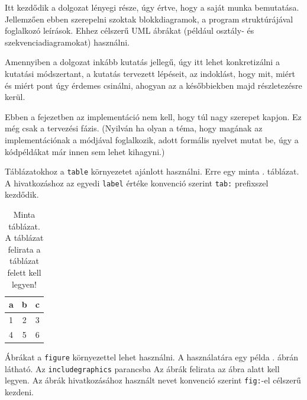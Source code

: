 \iffalse
Itt kezdődik a dolgozat lényegi része, úgy értve, hogy a saját munka bemutatása.
Jellemzően ebben szerepelni szoktak blokkdiagramok, a program struktúrájával foglalkozó leírások.
Ehhez célszerű UML ábrákat (például osztály- és szekvenciadiagramokat) használni.

Amennyiben a dolgozat inkább kutatás jellegű, úgy itt lehet konkretizálni a kutatási módszertant, a kutatás tervezett lépéseit, az indoklást, hogy mit, miért és miért pont úgy érdemes csinálni, ahogyan az a későbbiekben majd részletezésre kerül.

Ebben a fejezetben az implementáció nem kell, hogy túl nagy szerepet kapjon.
Ez még csak a tervezési fázis.
(Nyilván ha olyan a téma, hogy magának az implementációnak a módjával foglalkozik, adott formális nyelvet mutat be, úgy a kódpéldákat már innen sem lehet kihagyni.)


Táblázatokhoz a \texttt{table} környezetet ajánlott használni.
Erre egy minta . táblázat.
A hivatkozáshoz az egyedi \texttt{label} értéke konvenció szerint \texttt{tab:} prefixszel kezdődik.

\begin{table}[h]
\centering
\caption{Minta táblázat. A táblázat felirata a táblázat felett kell legyen!}
\label{tab:minta}
\begin{tabular}{l|c|c|}
a & b & c \\
\hline
1 & 2 & 3 \\
4 & 5 & 6 \\
\hline
\end{tabular}
\end{table}


Ábrákat a \texttt{figure} környezettel lehet használni.
A használatára egy példa . ábrán látható.
Az \texttt{includegraphics} parancsba 
Az ábrák felirata az ábra alatt kell legyen.
Az ábrák hivatkozásához használt nevet konvenció szerint \texttt{fig:}-el célszerű kezdeni.

